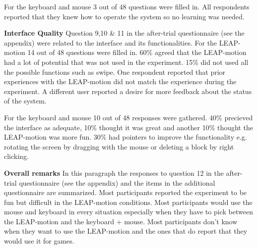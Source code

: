 For the keyboard and mouse 3 out of 48 questions were filled in. All respondents reported that they knew how to operate the system so no learning was needed. \newline

\noindent\textbf{Interface Quality}\newline
Question 9,10 \& 11 in the after-trial questionnaire (see the appendix) were related to the interface and its functionalities. For the LEAP-motion 14 out of 48 questions were filled in. 60\% agreed that the LEAP-motion had a lot of potential that was not used in the experiment. 15\% did not used all the possible functions such as swipe. One respondent reported that prior experiences with the LEAP-motion did not match the experience during the experiment. A different user reported a desire for more feedback about the status of the system. 

For the keyboard and mouse 10 out of 48 responses were gathered. 40\% precieved the interface as adequate, 10\% thought it was great and another 10\% thought the LEAP-motion was more fun. 30\% had pointers to improve the functionality e.g. rotating the screen by dragging with the mouse or deleting a block by right clicking.\newline

\noindent\textbf{Overall remarks}\newline
In this paragraph the responses to question 12 in the after-trial questionnaire (see the appendix) and the items in the additional questionnaire are summarized. Most participants reported the experiment to be fun but difficult in the LEAP-motion conditions. Most participants would use the mouse and keyboard in every situation especially when they have to pick between the LEAP-motion and the keyboard + mouse. Most participants don’t know when they want to use the LEAP-motion and the ones that do report that they would use it for games. \newline


